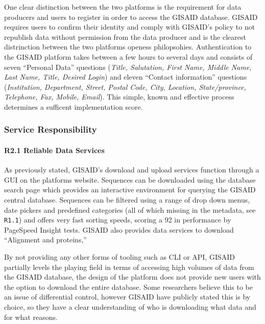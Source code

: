 \documentclass{article}
\begin{document}
One clear distinction between the two platforms is the requirement for
data producers and users to register in order to access the GISAID
database. GISAID requires users to confirm their identity and comply
with GISAID's policy to not republish data without permission from the
data producer and is the clearest distrinction between the two platforms
openess philopsohies. Authentication to the GISAID platform takes
between a few hours to several days and consists of seven ``Personal
Data'' questions (\emph{Title, Salutation, First Name, Middle Name, Last
Name, Title, Desired Login}) and eleven ``Contact information''
questions (\emph{Institution, Department, Street, Postal Code, City,
Location, State/province, Telephone, Fax, Mobile, Email}). This simple,
known and effective process determines a sufficent implementation score.

\hypertarget{service-responsibility-1}{%
\subsubsection{Service Responsibility}\label{service-responsibility-1}}

\hypertarget{r2.1-reliable-data-services}{%
\paragraph{R2.1 Reliable Data
Services}\label{r2.1-reliable-data-services}}

As previously stated, GISAID's download and upload services function
through a GUI on the platforms website. Sequences can be downloaded
using the database search page which provides an interactive environment
for querying the GISAID central database. Sequences can be filtered
using a range of drop down menus, date pickers and predefined categories
(all of which missing in the metadata, see \texttt{R1.1}) and offers
very fast sorting speeds, scoring a 92 in performance by PageSpeed
Insight tests. GISAID also provides data services to download
``Alignment and proteins,''

By not providing any other forms of tooling such as CLI or API, GISAID
partially levels the playing field in terms of accessing high volumes of
data from the GISAID database, the design of the platform does not
provide new users with the option to download the entire database. Some
researchers believe this to be an issue of differential control, however
GISAID have publicly stated this is by choice, so they have a clear
understanding of who is downloading what data and for what reasons.
\end{document}
